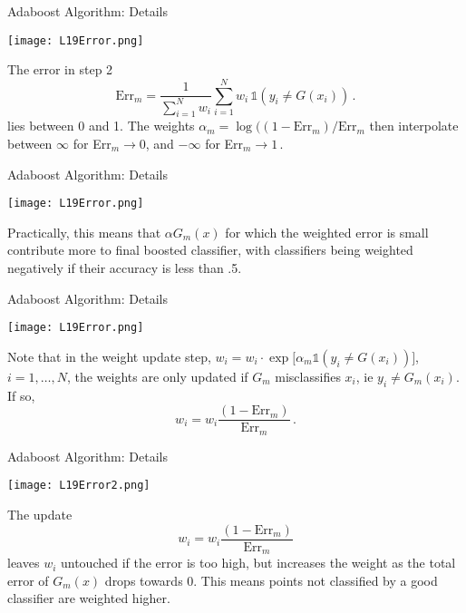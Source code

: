\documentclass[10pt, table, dvipsnames,xcdraw, handout]{beamer}
\begin{document}
\begin{frame}[fragile]{Adaboost Algorithm: Details}
  \begin{minipage}[t][0.5\textheight][t]{\textwidth}
	\centering \texttt{[image: L19Error.png]} 
  \end{minipage}
  \vfill
\begin{minipage}[t][0.5\textheight][t]{\textwidth}
The error in step 2
$$
\text{Err}_m = \frac{1}{\sum_{i=1}^N w_i} \sum_{i=1}^N w_i\, \mathds{1}(y_i \neq G(x_i))\,.
$$
lies between 0 and 1. \pause The weights  $\alpha_m = \log((1-\text{Err}_m)/\text{Err}_m$ then interpolate between $\infty$ for Err$_m\to0$, and $-\infty$ for Err$_m\to1$\,.
\end{minipage}
\end{frame}



\begin{frame}[fragile]{Adaboost Algorithm: Details}
  \begin{minipage}[t][0.5\textheight][t]{\textwidth}
	\centering \texttt{[image: L19Error.png]} 
  \end{minipage}
  \vfill
\begin{minipage}[t][0.5\textheight][t]{\textwidth}
Practically, this means that $\alpha G_m(x)$ for which the weighted error is small contribute more to final boosted classifier, with classifiers being weighted negatively if their accuracy is less than .5. \pause 
\end{minipage}
\end{frame}


\begin{frame}[fragile]{Adaboost Algorithm: Details}
  \begin{minipage}[t][0.5\textheight][t]{\textwidth}
	\centering \texttt{[image: L19Error.png]} 
  \end{minipage}
  \vfill
\begin{minipage}[t][0.5\textheight][t]{\textwidth}
Note that in the weight update step, $w_i = w_i\cdot \exp\big[ \alpha_m \mathds{1}(y_i \neq G(x_i)) \big]$, $i=1,\ldots, N$, the weights are only updated if $G_m$ misclassifies $x_i$, ie $y_i\neq G_m(x_i)$. \pause If so, 
$$
w_i = w_i \frac{(1-\text{Err}_m)}{\text{Err}_m}\,.
$$
\end{minipage}
\end{frame}


\begin{frame}[fragile]{Adaboost Algorithm: Details}
  \begin{minipage}[t][0.5\textheight][t]{\textwidth}
	\centering \texttt{[image: L19Error2.png]} 
  \end{minipage}
  \vfill
\begin{minipage}[t][0.5\textheight][t]{\textwidth}
The update
$$
w_i = w_i \frac{(1-\text{Err}_m)}{\text{Err}_m}
$$
leaves $w_i$ untouched if the error is too high, but increases the weight as the total error of $G_m(x)$ drops towards 0. \pause This means points not classified by a good classifier are weighted higher. 
\end{minipage}
\end{frame}
\end{document}
